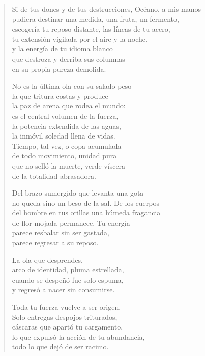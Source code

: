 \documentclass[12pt]{article}
\begin{document}
\clearpage
{}
\begin{verse}

Si de tus dones y de tus destrucciones, Océano, a mis manos\\
pudiera destinar una medida, una fruta, un fermento,\\
escogería tu reposo distante, las líneas de tu acero,\\
tu extensión vigilada por el aire y la noche,\\
y la energía de tu idioma blanco\\
que destroza y derriba sus columnas\\
en su propia pureza demolida.  

No es la última ola con su salado peso\\
la que tritura costas y produce\\
la paz de arena que rodea el mundo:\\
es el central volumen de la fuerza,\\
la potencia extendida de las aguas,\\
la inmóvil soledad llena de vidas.\\
Tiempo, tal vez, o copa acumulada\\
de todo movimiento, unidad pura\\
que no selló la muerte, verde víscera\\
de la totalidad abrasadora.  

Del brazo sumergido que levanta una gota\\
no queda sino un beso de la sal. De los cuerpos\\
del hombre en tus orillas una húmeda fragancia\\
de flor mojada permanece. Tu energía\\
parece resbalar sin ser gastada,\\
parece regresar a su reposo.  

La ola que desprendes,\\
arco de identidad, pluma estrellada,\\
cuando se despeñó fue solo espuma,\\
y regresó a nacer sin consumirse.  

Toda tu fuerza vuelve a ser origen.\\
Solo entregas despojos triturados,\\
cáscaras que apartó tu cargamento,\\
lo que expulsó la acción de tu abundancia,\\
todo lo que dejó de ser racimo.  


\end{verse}
\end{document}
